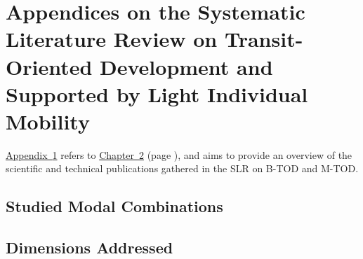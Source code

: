     \setcounter{section}{0}
\chapter{Appendices on the Systematic Literature Review on Transit-Oriented Development and Supported by Light Individual Mobility}
    \label{annexes:rsl}

\hyperref[annexes:rsl]{Appendix~\ref{annexes:rsl}} refers to \hyperref[chap2:titre]{Chapter~2} (page \pageref{chap2:titre}), and aims to provide an overview of the scientific and technical publications gathered in the \acrfull{SLR} on \acrfull{B-TOD} and \acrfull{M-TOD}.%

    \setcounter{tocdepth}{2}
    \renewcommand{\localcontentsname}{Structure of Appendix~\ref{annexes:rsl}}
\localtableofcontents

    \newpage
\section{Studied Modal Combinations}
    \label{annexes:rsl-combinaisons-modales}



\section{Dimensions Addressed}
    \label{annexes:rsl-resultats}

